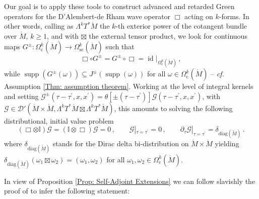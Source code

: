 Our goal is to apply these tools to construct advanced and retarded Green operators for the D'Alembert-de Rham wave operator $\Box$ acting on $k$-forms. In other words, calling as $\Lambda^k T^*\mathring{M}$ the $k$-th exterior power of the cotangent bundle over $\mathring{M}$, $k\geq 1$, and with $\boxtimes$ the external tensor product, we look for continuous maps $G^\pm:\Omega_{\mathrm{c}}^k(\mathring{M})\to \Omega_{\mathrm{sc}}^k(\mathring{M})$ such that 
$$\Box\circ G^\pm = G^\pm\circ\Box= \operatorname{id}|_{ \Omega_{\mathrm{c}}^k(\mathring{M})}\,,$$
while $\operatorname{supp}(G^\pm(\omega))\subseteq J^\pm(\operatorname{supp}(\omega))$ for all $\omega\in \Omega_{\mathrm{c}}^k(\mathring{M})$ -- \textit{cf.} Assumption \ref{Thm: assumption theorem}.
Working at the level of integral kernels and setting $\mathcal{G}^\pm(\tau-\tau^\prime,x,x^\prime)=\theta[\pm(\tau-\tau^\prime)]\mathcal{G}(\tau-\tau^\prime,x,x^\prime)$, with $\mathcal{G}\in\mathcal{D}'(\mathring{M}\times\mathring{M},\Lambda^kT^* \mathring{M}\boxtimes\Lambda^k T^*\mathring{M})$, this amounts to solving the following distributional, initial value problem 
\begin{equation}\label{Eq: system for G}
\left(\Box\otimes\mathbb{I}\right) \mathcal{G} = \left(\mathbb{I}\otimes\Box\right) \mathcal{G} = 0\,,\qquad
\mathcal{G}|_{\tau=\tau^\prime}=0\,,\qquad
\partial_\tau \mathcal{G}|_{\tau=\tau^\prime}=\delta_{\textrm{diag}(\mathring{M})}\,.
\end{equation}
where $\delta_{\textrm{diag}(\mathring{M})}$ stands for the Dirac delta bi-distribution on $\mathring{M}\times\mathring{M}$ yielding $\delta_{\textrm{diag}(\mathring{M})}(\omega_1\boxtimes\omega_2)=(\omega_1,\omega_2)$ for all $\omega_1,\omega_2\in \Omega_{\mathrm{c}}^k(\mathring{M})$.

In view of Proposition \ref{Prop: Self-Adjoint Extensions} we can follow slavishly the proof of \cite[Th. 30]{Dappiaggi-Drago-Ferreira-19} to infer the following statement:

